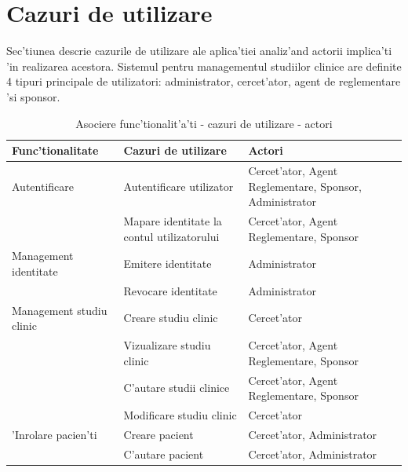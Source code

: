 \documentclass[12pt,a4paper,twoside]{report}
\begin{document}
\section{Cazuri de utilizare}
Sec'tiunea descrie cazurile de utilizare ale aplica'tiei analiz'and actorii implica'ti 'in realizarea acestora. Sistemul pentru managementul studiilor clinice are definite 4 tipuri principale de utilizatori: administrator, cercet'ator, agent de reglementare 'si sponsor.
\begin{table}[H]
\centering
\caption{Asociere func'tionalit'a'ti - cazuri de utilizare - actori}
\label{uc-table}
\begin{tabular}{|p{5cm}|p{5.3cm}|p{5.1cm}|}
\hline
\hline
Func'tionalitate          & Cazuri de utilizare                        & Actori                                                 \\ \hline
Autentificare            & Autentificare utilizator                   & Cercet'ator, Agent Reglementare, Sponsor, Administrator \\ \cline{2-3} 
                         & Mapare identitate la contul utilizatorului & Cercet'ator, Agent Reglementare, Sponsor                \\ \hline
Management identitate    & Emitere identitate                         & Administrator                                          \\ \cline{2-3} 
                         & Revocare identitate                        & Administrator                                          \\ \hline
Management studiu clinic & Creare studiu clinic                       & Cercet'ator                                             \\ \cline{2-3} 
                         & Vizualizare studiu clinic                  & Cercet'ator, Agent Reglementare, Sponsor                \\ \cline{2-3} 
                         & C'autare studii clinice                     & Cercet'ator, Agent Reglementare, Sponsor                \\ \cline{2-3} 
                         & Modificare studiu clinic                   & Cercet'ator                                             \\ \hline
'Inrolare pacien'ti        & Creare pacient                             & Cercet'ator, Administrator                              \\ \cline{2-3} 
                         & C'autare pacient                            & Cercet'ator, Administrator                              \\ \cline{2-3} 

\end{tabular}
\end{table}
\end{document}
